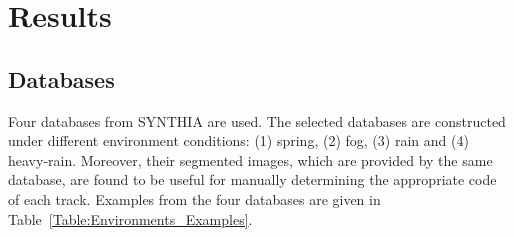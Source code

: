 \documentclass{svproc}
\begin{document}

\section{Results}
\subsection{Databases} 
Four databases from SYNTHIA \cite{Ros2016TheSYNTHIA} are used. The selected databases are constructed under different environment conditions: (1) spring, (2) fog, (3) rain and (4) heavy-rain. Moreover, their segmented images, which are provided by the same database, are found to be useful for manually determining the appropriate code of each track. Examples from the four databases are given in Table~\ref{Table:Environments_Examples}.	
\end{document}
